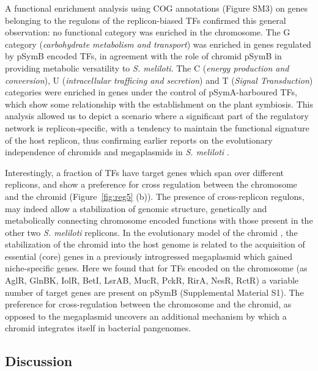 A functional enrichment analysis using COG annotations (Figure SM3) on genes belonging to the regulons of the replicon-biased TFs confirmed this general observation: no functional category was enriched in the chromosome.
 The G category (\emph{carbohydrate metabolism and transport}) was enriched in genes regulated by pSymB encoded TFs, in agreement with the role of chromid pSymB in providing metabolic versatility to \textit{S. meliloti}.
 The C (\emph{energy production and conversion}), U (\emph{intracellular trafficing and secretion}) and T (\emph{Signal Transduction}) categories were enriched in genes under the control of pSymA-harboured TFs, which show some relationship with the establishment on the plant symbiosis.
 This analysis allowed us to depict a scenario where a significant part of the regulatory network is replicon-specific, with a tendency to maintain the functional signature of the host replicon, thus confirming earlier reports on the evolutionary independence of chromids and megaplasmids in \textit{S. meliloti} \cite{harrison2010introducing, galardini2013replicon}.

Interestingly, a fraction of TFs have target genes which span over different replicons, and show a preference for cross regulation between the chromosome and the chromid (Figure~\ref{fig:reg5} (b)).
The presence of cross-replicon regulons, may indeed allow a stabilization of genomic structure, genetically and metabolically connecting chromosome encoded functions with those present in the other two \textit{S. meliloti} replicons.
 In the evolutionary model of the chromid \cite{harrison2010introducing, galardini2013replicon, maclean2014examination}, the stabilization of the chromid into the host genome is related to the acquisition of essential (core) genes in a previously introgressed megaplasmid which gained niche-specific genes.
 Here we found that for TFs encoded on the chromosome (as AglR, GlnBK, IolR, BetI, LsrAB, MucR, PckR, RirA, NesR, RctR) a variable number of target genes are present on pSymB (Supplemental Material S1). The preference for cross-regulation between the chromosome and the chromid, as opposed to the megaplasmid uncovers an additional mechanism by which a chromid integrates itself in bacterial pangenomes.


\subsection{Discussion}


